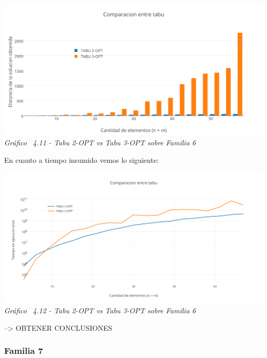 \vspace*{0.3cm} \vspace*{0.3cm}
  \begin{center}
 \includegraphics[scale=0.5]{./EJ4/comparativosinorden.png}\\
 {            \textit{Gráfico \ 4.11 - Tabu 2-OPT vs Tabu 3-OPT sobre Familia 6}}
  \end{center}
  \vspace*{0.3cm}

En cuanto a tiempo insumido vemos lo siguiente:

\vspace*{0.3cm} \vspace*{0.3cm}
  \begin{center}
 \includegraphics[scale=0.5]{./EJ4/comparacionsinorden1.png}\\
 {            \textit{Gráfico \ 4.12 - Tabu 2-OPT vs Tabu 3-OPT sobre Familia 6}}
  \end{center}
  \vspace*{0.3cm}
  
--> OBTENER CONCLUSIONES

\subsubsection*{Familia 7}

